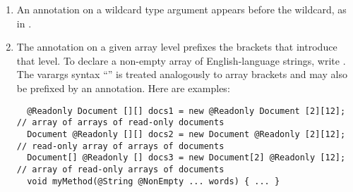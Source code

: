 \documentclass[10pt]{article}
\newcommand{\preverbnegspace}{\vspace{-5pt}}
\begin{document}
\begin{enumerate}


\item
  An annotation on a wildcard type argument appears before the wildcard,
  as in .


% 

\item
  The annotation on a given array level
  prefixes the brackets that introduce that level.  To declare
  a non-empty array of English-language strings, write .
  The varargs syntax ``'' is treated analogously to array brackets
  and may also be prefixed by an annotation.
%
  Here are examples:
\preverbnegspace
\begin{Verbatim}
  @Readonly Document [][] docs1 = new @Readonly Document [2][12]; // array of arrays of read-only documents
  Document @Readonly [][] docs2 = new Document @Readonly [2][12]; // read-only array of arrays of documents
  Document[] @Readonly [] docs3 = new Document[2] @Readonly [12]; // array of read-only arrays of documents
  void myMethod(@String @NonEmpty ... words) { ... }
\end{Verbatim}


\end{enumerate}
\end{document}
